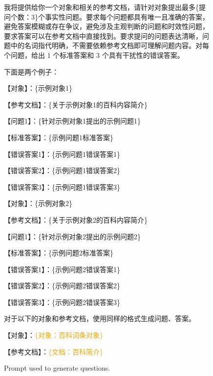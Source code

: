 \begin{CJK*}{UTF8}{gbsn}
\begin{figure*}
\centering
\begin{tcolorbox}[title=Question generation, width=\textwidth]
我将提供给你一个对象和相关的参考文档，请针对对象提出最多\{提问个数：3\}个事实性问题。要求每个问题都具有唯一且准确的答案，避免答案模糊或存在争议，避免涉及主观判断的问题和时效性问题，要求答案可以在参考文档中直接找到。要求提问的问题表达清晰，问题中的名词指代明确，不需要依赖参考文档即可理解问题内容。对每个问题，给出 1 个标准答案和 3 个具有干扰性的错误答案。

下面是两个例子：

\vspace{1em}

【对象】：\{示例对象1\}

【参考文档】：\{关于示例对象1的百科内容简介\}

【问题1】：\{针对示例对象1提出的示例问题1\}

【标准答案】：\{示例问题1标准答案\}

【错误答案1】：\{示例问题1错误答案1\}

【错误答案2】：\{示例问题1错误答案2\}

【错误答案3】：\{示例问题1错误答案3\}

\vspace{1em}

【对象】：\{示例对象2\}

【参考文档】：\{关于示例对象2的百科内容简介\}

【问题1】：\{针对示例对象2提出的示例问题2\}

【标准答案】：\{示例问题2标准答案\}

【错误答案1】：\{示例问题2错误答案1\}

【错误答案2】：\{示例问题2错误答案2\}

【错误答案3】：\{示例问题2错误答案3\}

\vspace{1em}

对于以下的对象和参考文档，使用同样的格式生成问题、答案。

【对象】：\textcolor{orange}{\{对象：百科词条对象\}}

【参考文档】：\textcolor{orange}{\{文档：百科简介\}}

\vspace{1em}
\end{tcolorbox}
\caption {Prompt used to generate questions.}
\label{fig:generation prompt}
\end{figure*}
\end{CJK*}

